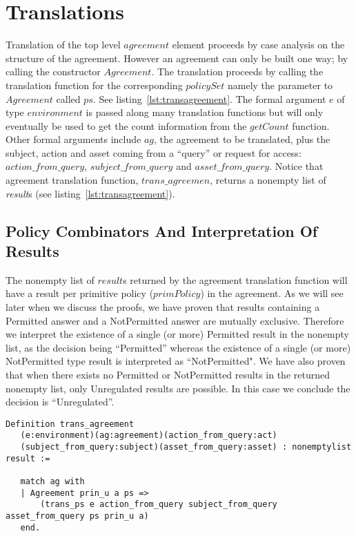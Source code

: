 \section{Translations}


Translation of the top level $agreement$ element proceeds by case analysis on the structure of the agreement. However an agreement can only be built one way; by calling the constructor $Agreement$. The translation proceeds by calling the translation function for the corresponding $policySet$ namely the parameter to $Agreement$ called $ps$. See listing~\ref{lst:transagreement}. The formal argument $e$ of type $environment$ is passed along many translation functions but will only eventually be used to get the count information from the $getCount$ function. Other formal arguments include $ag$, the agreement to be translated, plus the subject, action and asset coming from a ``query'' or request for access: $action\_from\_query$, $subject\_from\_query$ and $asset\_from\_query$. Notice that agreement translation function, $trans\_agreemen$, returns a nonempty list of \emph{result}s (see listing~\ref{lst:transagreement}).

\subsection{Policy Combinators And Interpretation Of Results}\label{subsec:policycombinators}

The nonempty list of $result$s returned by the agreement translation function will have a result per primitive policy ($primPolicy$) in the agreement. As we will see later when we discuss the proofs, we have proven that results containing a Permitted answer and a NotPermitted answer are mutually exclusive. Therefore we interpret the existence of a single (or more) Permitted result in the nonempty list, as the decision being ``Permitted'' whereas the existence of a single (or more) NotPermitted type result is interpreted as ``NotPermitted". We have also proven  that when there exists no Permitted or NotPermitted results in the returned nonempty list, only Unregulated results are possible. In this case we conclude the decision is ``Unregulated''. 

\begin{lstlisting}
Definition trans_agreement
   (e:environment)(ag:agreement)(action_from_query:act)
   (subject_from_query:subject)(asset_from_query:asset) : nonemptylist result :=

   match ag with
   | Agreement prin_u a ps => 
       (trans_ps e action_from_query subject_from_query asset_from_query ps prin_u a)
   end.
\end{lstlisting}

